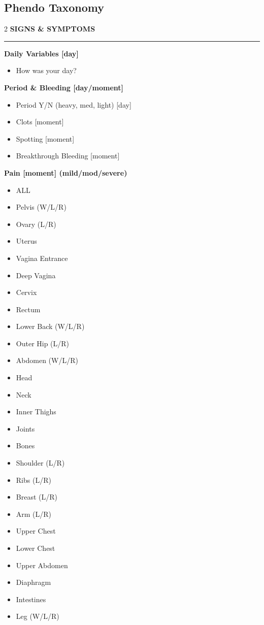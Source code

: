 \subsection{Phendo Taxonomy}
\label{sec:taxonomy}

\vspace{0.75em}

\begingroup
\fontsize{8pt}{1pt}\selectfont
\ttfamily
\setlength{\parindent}{0pt}
\setlength{\parskip}{6pt}

\begin{multicols}{2}
  \textbf{\uppercase{Signs \& Symptoms}}

  \vspace{0.125em}
  \noindent\rule{\columnwidth}{0.25pt}
  \vspace{0.0625em}

  \textbf{Daily Variables [day]}
  \begin{itemize}
    \item How was your day?
  \end{itemize}

  \textbf{Period \& Bleeding [day/moment]}
  \begin{itemize}
    \item Period Y/N (heavy, med, light) [day]
    \item Clots [moment]
    \item Spotting [moment]
    \item Breakthrough Bleeding [moment]
  \end{itemize}

  \textbf{Pain [moment] (mild/mod/severe)}
  \begin{itemize}
    \item ALL
    \item Pelvis (W/L/R)
    \item Ovary (L/R)
    \item Uterus
    \item Vagina Entrance
    \item Deep Vagina
    \item Cervix
    \item Rectum
    \item Lower Back (W/L/R)
    \item Outer Hip (L/R)
    \item Abdomen (W/L/R)
    \item Head
    \item Neck
    \item Inner Thighs
    \item Joints
    \item Bones
    \item Shoulder (L/R)
    \item Ribs (L/R)
    \item Breast (L/R)
    \item Arm (L/R)
    \item Upper Chest
    \item Lower Chest
    \item Upper Abdomen
    \item Diaphragm
    \item Intestines
    \item Leg (W/L/R)
  \end{itemize}


\end{multicols}
